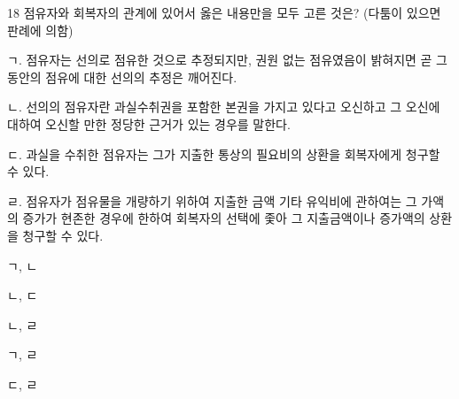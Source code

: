 \begin{question}{18}
점유자와 회복자의 관계에 있어서 옳은 내용만을 모두 고른 것은? (다툼이 있으면 판례에 의함)
\begin{framedtext}
ㄱ. 점유자는 선의로 점유한 것으로 추정되지만, 권원 없는 점유였음이 밝혀지면 곧 그 동안의 점유에 대한 선의의 추정은 깨어진다. \par
ㄴ. 선의의 점유자란 과실수취권을 포함한 본권을 가지고 있다고 오신하고 그 오신에 대하여 오신할 만한 정당한 근거가 있는 경우를 말한다. \par
ㄷ. 과실을 수취한 점유자는 그가 지출한 통상의 필요비의 상환을 회복자에게 청구할 수 있다. \par
ㄹ. 점유자가 점유물을 개량하기 위하여 지출한 금액 기타 유익비에 관하여는 그 가액의 증가가 현존한 경우에 한하여 회복자의 선택에 좇아 그 지출금액이나 증가액의 상환을 청구할 수 있다. \par
\end{framedtext}
\begin{choices}
  \item ㄱ, ㄴ
  \item ㄴ, ㄷ
  \item ㄴ, ㄹ
  \item ㄱ, ㄹ
  \item ㄷ, ㄹ
\end{choices}
\end{question}
